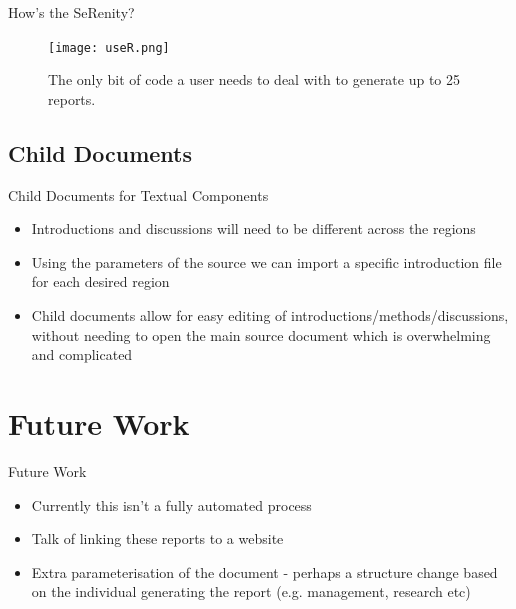 \documentclass{beamer}
\begin{document}
                \begin{frame}{How's the SeRenity?}
                    \begin{figure}
                        \centering
                        \texttt{[image: useR.png]}
                        \caption{The only bit of code a user needs to deal with to generate up to 25 reports.}
                    \end{figure}

                \end{frame}

          \subsection{Child Documents}
              \begin{frame}{Child Documents for Textual Components}
                  \begin{itemize}
                    \item Introductions and discussions will need to be different across the regions
                    \item Using the parameters of the source we can import a specific introduction file for each desired region
                    \item Child documents allow for easy editing of introductions/methods/discussions, without needing to open the main source document which is overwhelming and complicated
                  \end{itemize}
              \end{frame}

      \section{Future Work}
        \begin{frame}{Future Work}
          \begin{itemize}
            \item Currently this isn't a fully automated process
            \item Talk of linking these reports to a website
            \item Extra parameterisation of the document - perhaps a structure change based on the individual generating the report (e.g. management, research etc)
          \end{itemize}
        \end{frame}
\end{document}
